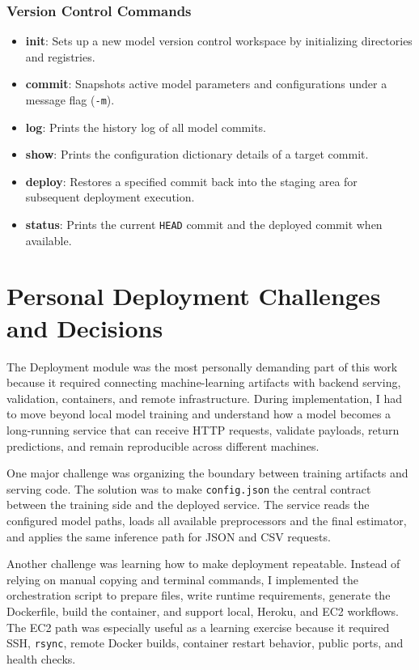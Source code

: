 \documentclass[12pt,a4paper,oneside]{report}
\begin{document}
\subsubsection{Version Control Commands}
\begin{itemize}[leftmargin=*]
  \item \textbf{init}: Sets up a new model version control workspace by initializing directories and registries.
  \item \textbf{commit}: Snapshots active model parameters and configurations under a message flag (\texttt{-m}).
  \item \textbf{log}: Prints the history log of all model commits.
  \item \textbf{show}: Prints the configuration dictionary details of a target commit.
  \item \textbf{deploy}: Restores a specified commit back into the staging area for subsequent deployment execution.
  \item \textbf{status}: Prints the current \texttt{HEAD} commit and the deployed commit when available.
\end{itemize}

\section{Personal Deployment Challenges and Decisions}
\noindent The Deployment module was the most personally demanding part of this work because it required connecting machine-learning artifacts with backend serving, validation, containers, and remote infrastructure. During implementation, I had to move beyond local model training and understand how a model becomes a long-running service that can receive HTTP requests, validate payloads, return predictions, and remain reproducible across different machines.

One major challenge was organizing the boundary between training artifacts and serving code. The solution was to make \texttt{config.json} the central contract between the training side and the deployed service. The service reads the configured model paths, loads all available preprocessors and the final estimator, and applies the same inference path for JSON and CSV requests.

Another challenge was learning how to make deployment repeatable. Instead of relying on manual copying and terminal commands, I implemented the orchestration script to prepare files, write runtime requirements, generate the Dockerfile, build the container, and support local, Heroku, and EC2 workflows. The EC2 path was especially useful as a learning exercise because it required SSH, \texttt{rsync}, remote Docker builds, container restart behavior, public ports, and health checks.
\end{document}
